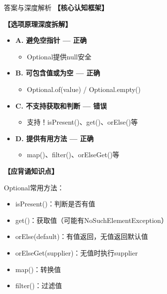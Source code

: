 \documentclass[12pt, a4paper]{ctexart}
\begin{document}
\begin{enumerate}[label=\textbf{\arabic*.}]
\begin{bluebox}{答案与深度解析}
		      \textbf{【核心认知框架】}

		      \textbf{【选项原理深度拆解】}
					  \begin{itemize}[label={}, leftmargin=*, nosep]


		      \item \textbf{A. 避免空指针 — 正确}
					  \begin{itemize}[label={}, nosep]
		      
			      \item Optional提供null安全
		      

					  \end{itemize}
		      \item \textbf{B. 可包含值或为空 — 正确}
					  \begin{itemize}[label={}, nosep]
		      
			      \item Optional.of(value) / Optional.empty()
		      

					  \end{itemize}
		      \item \textbf{C. 不支持获取和判断 — 错误}
					  \begin{itemize}[label={}, nosep]
		      
			      \item 支持！isPresent()、get()、orElse()等
		      

					  \end{itemize}
		      \item \textbf{D. 提供有用方法 — 正确}
					  \begin{itemize}[label={}, nosep]
		      
			      \item map()、filter()、orElseGet()等
		      

		      
					  \end{itemize}
					  \end{itemize}
\textbf{【应背诵知识点】}

		      Optional常用方法：
		      \begin{itemize}[label={}, nosep]
			      \item isPresent()：判断是否有值
			      \item get()：获取值（可能有NoSuchElementException）
			      \item orElse(default)：有值返回，无值返回默认值
			      \item orElseGet(supplier)：无值时执行supplier
			      \item map()：转换值
			      \item filter()：过滤值
		      \end{itemize}
	      \end{bluebox}

\end{enumerate}
\end{document}
